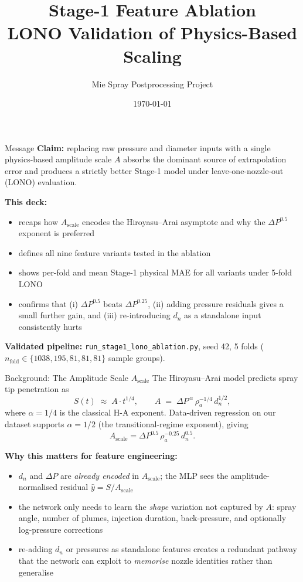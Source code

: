 \documentclass[UTF8,aspectratio=169]{ctexbeamer}
\title[Stage-1 Feature Ablation]{Stage-1 Feature Ablation\\LONO Validation of Physics-Based Scaling}
\author{Mie Spray Postprocessing Project}
\date{\today}
\newcommand{\warn}[1]{\textcolor{red!65!black}{#1}}
\begin{document}
\begin{frame}
  \titlepage
\end{frame}

\begin{frame}{Message}
\small
\textbf{Claim:} replacing raw pressure and diameter inputs with a single physics-based amplitude scale $A$ absorbs the dominant source of extrapolation error and produces a strictly better Stage-1 model under leave-one-nozzle-out (LONO) evaluation.

\vspace{0.5em}
\textbf{This deck:}
\begin{itemize}
  \item recaps how $A_{\mathrm{scale}}$ encodes the Hiroyasu--Arai asymptote and why the $\Delta P^{0.5}$ exponent is preferred
  \item defines all nine feature variants tested in the ablation
  \item shows per-fold and mean Stage-1 physical MAE for all variants under 5-fold LONO
  \item confirms that (i) $\Delta P^{0.5}$ beats $\Delta P^{0.25}$, (ii) adding pressure residuals gives a small further gain, and (iii) re-introducing $d_n$ as a standalone input consistently \warn{hurts}
\end{itemize}

\vspace{0.5em}
\textbf{Validated pipeline:} \texttt{run\_stage1\_lono\_ablation.py}, seed 42, 5 folds
($n_{\mathrm{fold}} \in \{1038, 195, 81, 81, 81\}$ sample groups).
\end{frame}

\begin{frame}{Background: The Amplitude Scale $A_{\mathrm{scale}}$}
\small
The Hiroyasu--Arai model predicts spray tip penetration as
\[
  S(t) \;\approx\; A \cdot t^{1/4},
  \qquad
  A \;=\; \Delta P^{\,\alpha}\,\rho_a^{-1/4}\,d_n^{1/2},
\]
where $\alpha = 1/4$ is the classical H-A exponent.
Data-driven regression on our dataset supports $\alpha = 1/2$ (the transitional-regime exponent), giving
\[
  \boxed{A_{\mathrm{scale}} = \Delta P^{0.5}\,\rho_a^{-0.25}\,d_n^{0.5}.}
\]

\vspace{0.4em}
\textbf{Why this matters for feature engineering:}
\begin{itemize}
  \item $d_n$ and $\Delta P$ are \emph{already encoded} in $A_{\mathrm{scale}}$; the MLP sees the
        amplitude-normalised residual $\hat{y} = S/A_{\mathrm{scale}}$
  \item the network only needs to learn the \emph{shape} variation not captured by $A$: spray
        angle, number of plumes, injection duration, back-pressure, and optionally
        log-pressure corrections
  \item re-adding $d_n$ or pressures as standalone features creates a redundant pathway that
        the network can exploit to \emph{memorise} nozzle identities rather than generalise
\end{itemize}
\end{frame}
\end{document}
